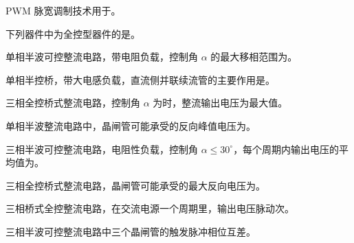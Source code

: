 \documentclass[电力电子]{subfiles}
\begin{document}
\begin{ti}
	PWM 脉宽调制技术用于。
\end{ti}

\begin{ti}
	下列器件中为全控型器件的是。
\end{ti}

\begin{ti}
	单相半波可控整流电路，带电阻负载，控制角 $\alpha$ 的最大移相范围为。
\end{ti}

\begin{ti}
	单相半控桥，带大电感负载，直流侧并联续流管的主要作用是。
\end{ti}

\begin{ti}
	三相全控桥式整流电路，控制角 $\alpha$ 为时，整流输出电压为最大值。
\end{ti}

\begin{ti}
	单相半波整流电路中，晶闸管可能承受的反向峰值电压为。
\end{ti}

\begin{ti}
	三相半波可控整流电路，电阻性负载，控制角 $\alpha \leq 30^\circ$，每个周期内输出电压的平均值为。
\end{ti}

\begin{ti}
	三相全控桥式整流电路，晶闸管可能承受的最大反向电压为。
\end{ti}

\begin{ti}
	三相桥式全控整流电路，在交流电源一个周期里，输出电压脉动次。
\end{ti}

\begin{ti}
	三相半波可控整流电路中三个晶闸管的触发脉冲相位互差。
\end{ti}
\end{document}

